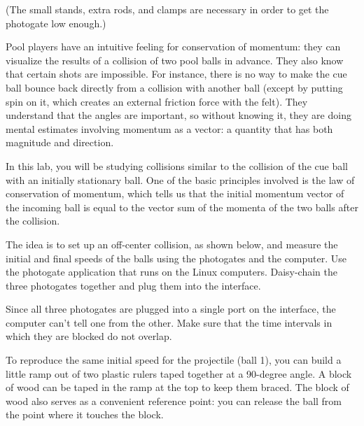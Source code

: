 \label{lab:momentum-vector}

\apparatus
{}

(The small stands, extra rods, and clamps are necessary in order
to get the photogate low enough.)


\introduction

Pool players have an intuitive feeling for conservation of
momentum: they can visualize the results of a collision of
two pool balls in advance.  They also know that certain
shots are impossible.  For instance, there is no way to make
the cue ball bounce back directly from a collision with
another ball (except by putting spin on it, which creates an
external friction force with the felt).  They understand
that the angles are important, so without knowing it, they
are doing mental estimates involving momentum as a vector: a
quantity that has both magnitude and direction.

In this lab, you will be studying collisions similar to the
collision of the cue ball with an initially stationary ball.
One of the basic principles involved is the law of conservation of momentum,
which tells us that the initial momentum vector of the incoming ball
is equal to the vector sum of the momenta of the two balls after the
collision.



The idea is to set up an off-center collision, as shown
below, and measure the initial and final speeds of the balls
using the photogates and the computer.  
Use the photogate application that runs on the Linux computers.
Daisy-chain the three photogates together and plug them into
the interface.

Since all three photogates are plugged into a single port on
the interface, the computer can't tell one from the other.
Make sure that the time intervals in which they are blocked do
not overlap.


To reproduce the same initial speed for the projectile (ball
1), you can build a little ramp out of two plastic rulers
taped together at a 90-degree angle.  A block of wood can be
taped in the ramp at the top to keep them braced.  The block
of wood also serves as a convenient reference point: you can
release the ball from the point where it touches the block.

